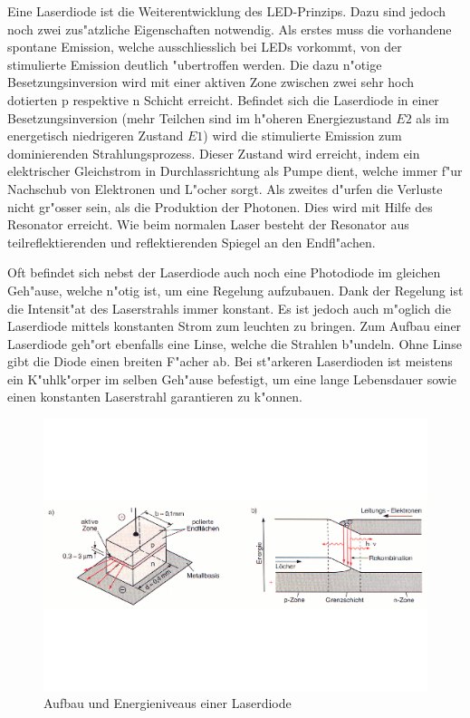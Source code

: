 \begin{refsection}
Eine Laserdiode ist die Weiterentwicklung des LED-Prinzips. Dazu sind jedoch 
noch zwei zus"atzliche Eigenschaften notwendig. Als erstes muss die vorhandene 
spontane Emission, welche ausschliesslich bei LEDs vorkommt, von der 
stimulierte Emission deutlich "ubertroffen werden. Die dazu n"otige 
Besetzungsinversion wird mit einer aktiven Zone zwischen zwei sehr hoch 
dotierten p respektive n Schicht erreicht. Befindet sich die Laserdiode in 
einer Besetzungsinversion (mehr Teilchen sind im h"oheren Energiezustand $E2$ 
als im energetisch niedrigeren Zustand $E1$) wird die stimulierte Emission zum 
dominierenden Strahlungsprozess. Dieser Zustand wird erreicht, indem ein 
elektrischer Gleichstrom in Durchlassrichtung als Pumpe dient, welche immer 
f"ur Nachschub von Elektronen und L"ocher sorgt. Als zweites d"urfen die 
Verluste nicht gr"osser sein, als die Produktion der Photonen.
Dies wird mit Hilfe des Resonator erreicht.
Wie beim normalen Laser besteht der Resonator aus teilreflektierenden 
und reflektierenden Spiegel an den Endfl"achen.

Oft befindet sich nebst der Laserdiode auch noch eine Photodiode im gleichen 
Geh"ause, welche n"otig ist, um eine Regelung aufzubauen. Dank der Regelung 
ist die Intensit"at des Laserstrahls immer konstant. Es ist jedoch auch 
m"oglich die Laserdiode mittels konstanten Strom zum leuchten zu bringen. Zum 
Aufbau einer Laserdiode geh"ort ebenfalls eine Linse, welche die Strahlen 
b"undeln. Ohne Linse gibt die Diode einen breiten F"acher ab. Bei st"arkeren 
Laserdioden ist meistens ein K"uhlk"orper im selben Geh"ause befestigt, um 
eine lange Lebensdauer sowie einen konstanten Laserstrahl garantieren zu 
k"onnen. 
\begin{figure}
\centering
\includegraphics[scale=0.35]{laser/bilder/laserdiodeb.pdf}
\caption{Aufbau und Energieniveaus einer Laserdiode \cite{halbleiterlaser}}
\label{fig:Laserdiode}
\end{figure}


\end{refsection}
